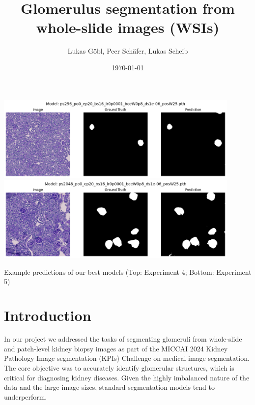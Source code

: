 \documentclass[12pt]{article}
\title{Glomerulus segmentation from whole-slide images (WSIs)}
\author{Lukas Göbl, Peer Schäfer, Lukas Scheib}
\date{\today}
\begin{document}
\begin{titlepage}
    \centering
    \maketitle

    \vspace{2cm}

    \includegraphics[width=0.9\textwidth]{Images/smol_good.png} \\
    \vspace{1cm}
    \includegraphics[width=0.9\textwidth]{Images/big_good.png}

    \vspace{0.5cm}

    \captionsetup{type=figure, font=small}
    \begin{center}
        \caption*{Example predictions of our best models (Top: Experiment 4; Bottom: Experiment 5)}
    \end{center}
\end{titlepage}

\section{Introduction}

In our project we addressed the tasks of segmenting glomeruli from whole-slide and patch-level kidney biopsy images as part of the MICCAI 2024 Kidney Pathology Image segmentation (KPIs) Challenge on medical image segmentation. The core objective was to accurately identify glomerular structures, which is critical for diagnosing kidney diseases. Given the highly imbalanced nature of the data and the large image sizes, standard segmentation models tend to underperform.
\end{document}

